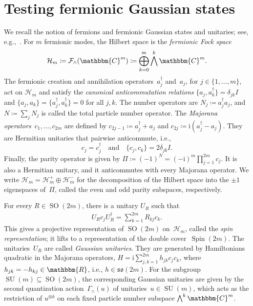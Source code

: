 \documentclass[11pt,a4paper]{article}
\numberwithin{equation}{section}
\newcommand{\ot}{\otimes}
\newcommand{\op}{\oplus}
\newcommand{\RR}{\mathbbm{R}}
\newcommand{\CC}{\mathbbm{C}}
\newcommand{\HH}{\mathcal{H}}
\newcommand{\id}{I}
\newcommand{\1}{\mathbf{1}}
\DeclareMathOperator{\SO}{SO}
\DeclareMathOperator{\SU}{SU}
\DeclareMathOperator{\Spin}{Spin}
\begin{document}
\section{Testing fermionic Gaussian states}\label{sec:fermions}
We recall the notion of fermions and fermionic Gaussian states and unitaries; see, e.g.,~\cite{bravyi2005lagrangian}.
For $m$ fermionic modes, the Hilbert space is the \emph{fermionic Fock space}
\begin{align*}
    \HH_m
    \coloneqq \mathcal F_\wedge(\CC^m)
    \coloneqq \bigoplus_{k=0}^m\bigwedge^k\CC^m.
\end{align*}
The fermionic creation and annihilation operators~$a_j^\dagger$ and~$a_j$, for $j\in\{1,\ldots,m\}$, act on $\HH_m$ and satisfy the \emph{canonical anticommutation relations} $\{a_j,a_k^\dagger\}=\delta_{jk}\id$ and $\{a_j,a_k\}=\{a_j^\dagger,a_k^\dagger\}=0$ for all $j,k$.
The number operators are $N_j \coloneqq a_j^\dagger a_j$, and $N \coloneqq \sum_jN_j$ is called the total particle number operator.
The \emph{Majorana operators}~$c_1,\dots,c_{2m}$ are defined by $c_{2j-1} \coloneqq a_j^\dagger+a_j$ and $c_{2j} \coloneqq \mathrm{i}(a_j^\dagger-a_j)$.
They are Hermitian unitaries that pairwise anticommute, i.e.,
\[ c_j=c_j^\dagger \quad\text{and}\quad \{c_j,c_k\}=2\delta_{jk}\id. \]
Finally, the parity operator is given by $\Pi \coloneqq (-1)^N = (-\mathrm{i})^m\prod_{j=1}^{2m} c_j$.
It is also a Hermitian unitary, and it anticommutes with every Majorana operator.
We write $\HH_m=\HH_m^+\op\HH_m^-$ for the decomposition of the Hilbert space into the $\pm1$ eigenspaces of~$\Pi$, called the even and odd parity subspaces, respectively.

For every $R\in\SO(2m)$, there is a unitary $U_R$ such that
\begin{align}\label{eq:action fermionic gaussian unitary}
    U_Rc_jU_R^\dagger
    =\sum_{k=1}^{2m}R_{kj}c_k.
\end{align}
This gives a projective representation of $\SO(2m)$ on~$\HH_m$, called the \emph{spin representation}; it lifts to a representation of the double cover~$\Spin(2m)$.
The unitaries~$U_R$ are called \emph{Gaussian unitaries}.
They are generated by Hamiltonians quadratic in the Majorana operators, $H=\mathrm{i}\sum_{j,k=1}^{2m}h_{jk}c_jc_k$, where~$h_{jk} = -h_{kj} \in \RR$, i.e., $h \in \mathfrak{so}(2m)$.
For the subgroup $\SU(m) \subseteq \SO(2m)$, the corresponding Gaussian unitaries are given by the second quantization action~$\Gamma_{\wedge}(u)$ of unitaries~$u\in\SU(m)$, which acts as the restriction of $u^{\ot k}$ on each fixed particle number subspace $\bigwedge^k \CC^m$.
\end{document}
